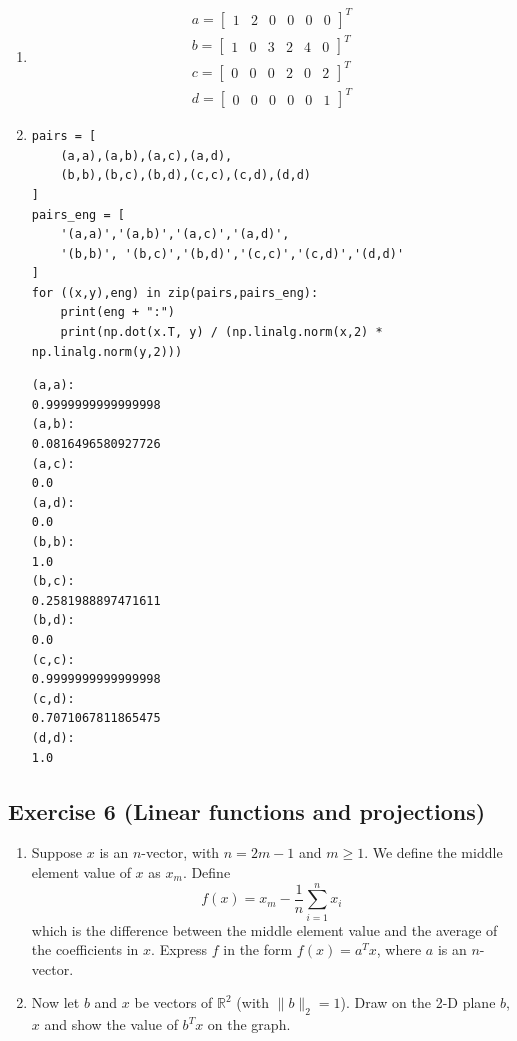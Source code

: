 \documentclass[11pt]{article}
\begin{document}
\begin{solution}
\begin{enumerate}
\item
\begin{align*}
    a = \begin{bmatrix} 1& 2& 0& 0& 0& 0 \end{bmatrix}^T \\
    b = \begin{bmatrix} 1& 0& 3& 2& 4& 0 \end{bmatrix}^T \\
    c = \begin{bmatrix} 0& 0& 0& 2& 0& 2 \end{bmatrix}^T \\
    d = \begin{bmatrix} 0& 0& 0& 0& 0& 1 \end{bmatrix}^T
\end{align*}

\item
\begin{verbatim}
pairs = [
    (a,a),(a,b),(a,c),(a,d),
    (b,b),(b,c),(b,d),(c,c),(c,d),(d,d)
]
pairs_eng = [
    '(a,a)','(a,b)','(a,c)','(a,d)',
    '(b,b)', '(b,c)','(b,d)','(c,c)','(c,d)','(d,d)'
]
for ((x,y),eng) in zip(pairs,pairs_eng):
    print(eng + ":")
    print(np.dot(x.T, y) / (np.linalg.norm(x,2) * np.linalg.norm(y,2)))
\end{verbatim}

\begin{verbatim}
(a,a):
0.9999999999999998
(a,b):
0.0816496580927726
(a,c):
0.0
(a,d):
0.0
(b,b):
1.0
(b,c):
0.2581988897471611
(b,d):
0.0
(c,c):
0.9999999999999998
(c,d):
0.7071067811865475
(d,d):
1.0
\end{verbatim}
\end{enumerate}
\end{solution}

\newpage
\subsection*{Exercise 6 (Linear functions and projections)}

\begin{enumerate}
    \item Suppose $x$ is an $n$-vector, with $n = 2m - 1$ and $m \geq 1$. We define the middle element value of $x$ as $x_m$. Define $$f(x) = x_m - \frac{1}{n}\sum_{i = 1}^n x_i$$ which is the difference between the middle element value and the average of the coefficients in $x$. Express $f$ in the form $f(x) = a^Tx$, where $a$ is an $n$-vector.

    \item Now let $b$ and $x$ be vectors of $\mathbb{R}^2$ (with $\|b\|_2 = 1$). Draw on the 2-D plane $b$, $x$ and show the value of $b^Tx$ on the graph.
\end{enumerate}
\end{document}
